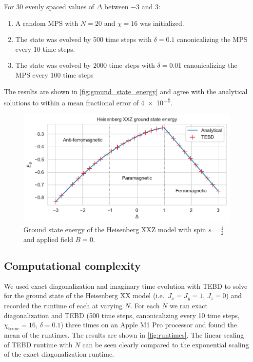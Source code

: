 \documentclass[a4paper, headsepline, footheight=13.6pt]{scrartcl}
\begin{document}
For 30 evenly spaced values of $\Delta$ between $-3$ and $3$:
\begin{enumerate}
    \item A random MPS with $N=20$ and $\chi=16$ was initialized.
    \item The state was evolved by 500 time steps with $\delta=0.1$ canonicalizing the MPS every 10 time steps.
    \item The state was evolved by 2000 time steps with $\delta=0.01$ canonicalizing the MPS every 100 time steps
\end{enumerate}
The results are shown in \autoref{fig:ground_state_energy} and agree with the analytical solutions to within a mean fractional error of \qty{4e-5}{}.

\begin{figure}[htbp]
    \centering
    \includegraphics[width=\textwidth]{figures/ground_state_energy.pdf}
    \caption{Ground state energy of the Heisenberg XXZ model with spin $s=\frac12$ and applied field $B=0$.}
    \label{fig:ground_state_energy}
\end{figure}

\subsection{Computational complexity} \label{subsec:complexity}
We used exact diagonalization and imaginary time evolution with TEBD to solve for the ground state of the Heisenberg XX model (i.e.\ $J_x=J_y=1$, $J_z=0$) and recorded the runtime of each at varying $N$. For each $N$ we ran exact diagonalization and TEBD (500 time steps, canonicalizing every 10 time steps, $\chi_\text{trunc}=16$, $\delta=0.1$) three times on an Apple M1 Pro processor and found the mean of the runtimes. The results are shown in \autoref{fig:runtimes}. The linear scaling of TEBD runtime with $N$ can be seen clearly compared to the exponential scaling of the exact diagonalization runtime.
\end{document}
